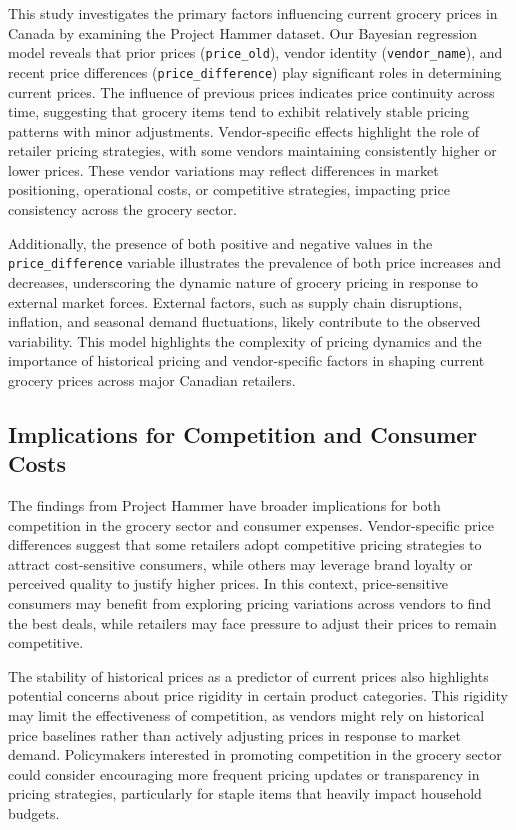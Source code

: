 \documentclass[
  letterpaper,
  DIV=11,
  numbers=noendperiod]{scrartcl}
\begin{document}
This study investigates the primary factors influencing current grocery
prices in Canada by examining the Project Hammer dataset. Our Bayesian
regression model reveals that prior prices (\texttt{price\_old}), vendor
identity (\texttt{vendor\_name}), and recent price differences
(\texttt{price\_difference}) play significant roles in determining
current prices. The influence of previous prices indicates price
continuity across time, suggesting that grocery items tend to exhibit
relatively stable pricing patterns with minor adjustments.
Vendor-specific effects highlight the role of retailer pricing
strategies, with some vendors maintaining consistently higher or lower
prices. These vendor variations may reflect differences in market
positioning, operational costs, or competitive strategies, impacting
price consistency across the grocery sector.

Additionally, the presence of both positive and negative values in the
\texttt{price\_difference} variable illustrates the prevalence of both
price increases and decreases, underscoring the dynamic nature of
grocery pricing in response to external market forces. External factors,
such as supply chain disruptions, inflation, and seasonal demand
fluctuations, likely contribute to the observed variability. This model
highlights the complexity of pricing dynamics and the importance of
historical pricing and vendor-specific factors in shaping current
grocery prices across major Canadian retailers.

\subsection{Implications for Competition and Consumer
Costs}\label{implications-for-competition-and-consumer-costs}

The findings from Project Hammer have broader implications for both
competition in the grocery sector and consumer expenses. Vendor-specific
price differences suggest that some retailers adopt competitive pricing
strategies to attract cost-sensitive consumers, while others may
leverage brand loyalty or perceived quality to justify higher prices. In
this context, price-sensitive consumers may benefit from exploring
pricing variations across vendors to find the best deals, while
retailers may face pressure to adjust their prices to remain
competitive.

The stability of historical prices as a predictor of current prices also
highlights potential concerns about price rigidity in certain product
categories. This rigidity may limit the effectiveness of competition, as
vendors might rely on historical price baselines rather than actively
adjusting prices in response to market demand. Policymakers interested
in promoting competition in the grocery sector could consider
encouraging more frequent pricing updates or transparency in pricing
strategies, particularly for staple items that heavily impact household
budgets.
\end{document}
